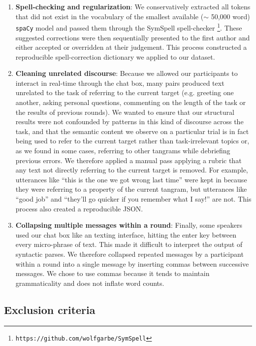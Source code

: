 \documentclass[alpha-refs]{wiley-article}
\begin{document}
\begin{enumerate}

\item \textbf{Spell-checking and regularization}: We conservatively extracted all tokens that did not exist in the vocabulary of the smallest available ($\sim$ 50,000 word) \texttt{spaCy} model and passed them through the SymSpell spell-checker \footnote{\texttt{https://github.com/wolfgarbe/SymSpell}}. These suggested corrections were then sequentially presented to the first author and either accepted or overridden at their judgement. This process constructed a reproducible spell-correction dictionary we applied to our dataset.

\item \textbf{Cleaning unrelated discourse}: Because we allowed our participants to interact in real-time through the chat box, many pairs produced text unrelated to the task of referring to the current target (e.g. greeting one another, asking personal questions, commenting on the length of the task or the results of previous rounds). We wanted to ensure that our structural results were not confounded by patterns in this kind of discourse across the task, and that the semantic content we observe on a particular trial is in fact being used to refer to the current target rather than task-irrelevant topics or, as we found in some cases, referring to other tangrams while debriefing previous errors. We therefore applied a manual pass applying a rubric that any text not directly referring to the current target is removed. For example, utterances like ``this is the one we got wrong last time'' were kept in because they were referring to a property of the current tangram, but utterances like ``good job'' and ``they'll go quicker if you remember what I say!'' are not. This process also created a reproducible JSON.

\item \textbf{Collapsing multiple messages within a round}: Finally, some speakers used our chat box like an texting interface, hitting the enter key between every micro-phrase of text. This made it difficult to interpret the output of syntactic parses. We therefore collapsed repeated messages by a participant within a round into a single message by inserting commas between successive messages. We chose to use commas because it tends to maintain grammaticality and does not inflate word counts.

\end{enumerate}

\subsection{Exclusion criteria}
\end{document}
